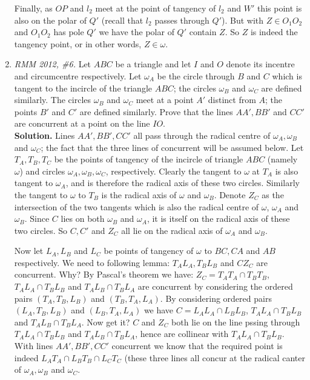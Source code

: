 \documentclass[11pt,a4paper]{article}
\begin{document}
\begin{enumerate}
Finally, as $OP$ and $l_2$ meet at the point of tangency of $l_2$ and $W'$ this point is also on the polar of $Q'$ (recall that $l_2$ passes through $Q'$). But with $Z\in O_1O_2$ and $O_1O_2$ has pole $Q'$ we have the polar of $Q'$ contain $Z$. So $Z$ is indeed the tangency point, or in other words, $Z\in\omega$.

\item \emph {RMM 2012, \#6.} Let $ABC$ be a triangle and let $I$ and $O$ denote its incentre and circumcentre respectively. Let $\omega_A$ be the circle through $B$ and $C$ which is tangent to the incircle of the triangle $ABC$; the circles $\omega_B$ and $\omega_C$ are defined similarly. The circles $\omega_B$ and $\omega_C$ meet at a point $A'$ distinct from $A$; the points $B'$ and $C'$ are defined similarly. Prove that the lines $AA',BB'$ and $CC'$ are concurrent at a point on the line $IO$.\\
\textbf {Solution.} Lines $AA', BB', CC'$ all pass through the radical centre of $\omega_A, \omega_B$ and $\omega_C$; the fact that the three lines of concurrent will be assumed below. Let $T_A, T_B, T_C$ be the points of tangency of the incircle of triangle $ABC$ (namely $\omega$) and circles $\omega_A, \omega_B, \omega_C$, respectively. Clearly the tangent to $\omega$ at $T_A$ is also tangent to $\omega_A$, and is therefore the radical axis of these two circles. Similarly the tangent to $\omega$ to $T_B$ is the radical axis of $\omega$ and $\omega_B$. Denote $Z_C$ as the intersection of the two tangents which is also the radical centre of $\omega$, $\omega_A$ and $\omega_B$. Since $C$ lies on both  $\omega_B$ and $\omega_A$, it is itself on the radical axis of these two circles. So $C, C'$ and $Z_C$ all lie on the radical axis of $\omega_A$ and $\omega_B$.

Now let $L_A, L_B$ and $L_C$ be points of tangency of $\omega$ to $BC, CA$ and $AB$ respectively. We need to following lemma: $T_AL_A, T_BL_B$ and $CZ_C$ are concurrent. Why? By Pascal's theorem we have: $Z_C=T_AT_A\cap T_BT_B$, $T_AL_A\cap T_BL_B$ and $T_AL_B\cap T_BL_A$ are concurrent by considering the ordered pairs $(T_A, T_B, L_B)$ and $(T_B, T_A, L_A)$. By considering ordered pairs $(L_A, T_B, L_B)$ and $(L_B, T_A, L_A)$ we have $C=L_AL_A\cap L_BL_B$, $T_AL_A\cap T_BL_B$ and $T_AL_B\cap T_BL_A$. Now get it? $C$ and $Z_C$ both lie on the line pssing through $T_AL_A\cap T_BL_B$ and $T_AL_B\cap T_BL_A$, hence are collinear with $T_AL_A\cap  T_BL_B$. With lines $AA', BB', CC'$ concurrent we know that the required point is indeed $L_AT_A\cap L_BT_B\cap L_CT_C$ (these three lines all concur at the radical canter of $\omega_A, \omega_B$ and $\omega_C$. 


\end{enumerate}
\end{document}
